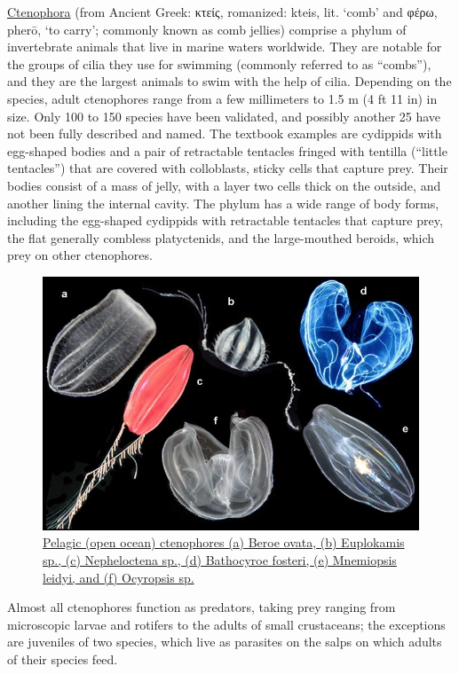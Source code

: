 \href{https://en.wikipedia.org/wiki/Ctenophora}{Ctenophora} (from Ancient Greek: κτείς, romanized: kteis, lit. `comb' and φέρω, pherō, `to carry'; commonly known as comb jellies) comprise a phylum of invertebrate animals that live in marine waters worldwide. They are notable for the groups of cilia they use for swimming (commonly referred to as ``combs''), and they are the largest animals to swim with the help of cilia. Depending on the species, adult ctenophores range from a few millimeters to 1.5 m (4 ft 11 in) in size. Only 100 to 150 species have been validated, and possibly another 25 have not been fully described and named. The textbook examples are cydippids with egg-shaped bodies and a pair of retractable tentacles fringed with tentilla (``little tentacles'') that are covered with colloblasts, sticky cells that capture prey. Their bodies consist of a mass of jelly, with a layer two cells thick on the outside, and another lining the internal cavity. The phylum has a wide range of body forms, including the egg-shaped cydippids with retractable tentacles that capture prey, the flat generally combless platyctenids, and the large-mouthed beroids, which prey on other ctenophores.



\begin{figure}

{\centering \includegraphics[width=0.7\linewidth]{./figures/animals/Pelagic_ctenophores} 

}

\caption{\href{https://commons.wikimedia.org/wiki/File:Pelagic_ctenophores.png}{Pelagic (open ocean) ctenophores (a) Beroe ovata, (b) Euplokamis sp., (c) Nepheloctena sp., (d) Bathocyroe fosteri, (e) Mnemiopsis leidyi, and (f) Ocyropsis sp.}}\label{fig:ctenophora}
\end{figure}

Almost all ctenophores function as predators, taking prey ranging from microscopic larvae and rotifers to the adults of small crustaceans; the exceptions are juveniles of two species, which live as parasites on the salps on which adults of their species feed.

